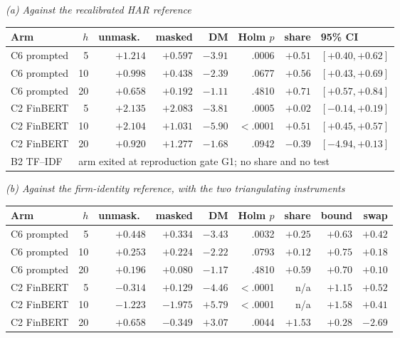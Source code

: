 \begin{table}[htbp]
\emph{(a) Against the recalibrated HAR reference}\\[0.4ex]
\begin{tabular}{@{}lrrrrrrl@{}}
\toprule
Arm & $h$ & unmask.\ & masked & DM & Holm $p$ & share & 95\% CI \\
\midrule
C6 prompted   &  5 & $+1.214$ & $+0.597$ & $-3.91$ & .0006 & $+0.51$ & $[+0.40, +0.62]$ \\
C6 prompted   & 10 & $+0.998$ & $+0.438$ & $-2.39$ & .0677 & $+0.56$ & $[+0.43, +0.69]$ \\
C6 prompted   & 20 & $+0.658$ & $+0.192$ & $-1.11$ & .4810 & $+0.71$ & $[+0.57, +0.84]$ \\
C2 FinBERT    &  5 & $+2.135$ & $+2.083$ & $-3.81$ & .0005 & $+0.02$ & $[-0.14, +0.19]$ \\
C2 FinBERT    & 10 & $+2.104$ & $+1.031$ & $-5.90$ & $<$.0001 & $+0.51$ & $[+0.45, +0.57]$ \\
C2 FinBERT    & 20 & $+0.920$ & $+1.277$ & $-1.68$ & .0942 & $-0.39$ & $[-4.94, +0.13]$ \\
B2 TF--IDF    & \multicolumn{7}{l}{arm exited at reproduction gate G1; no share and no test} \\
\bottomrule
\end{tabular}

\vspace{1.2ex}
\emph{(b) Against the firm-identity reference, with the two triangulating instruments}\\[0.4ex]
\begin{tabular}{@{}lrrrrrrrr@{}}
\toprule
Arm & $h$ & unmask.\ & masked & DM & Holm $p$ & share & bound & swap \\
\midrule
C6 prompted   &  5 & $+0.448$ & $+0.334$ & $-3.43$ & .0032 & $+0.25$ & $+0.63$ & $+0.42$ \\
C6 prompted   & 10 & $+0.253$ & $+0.224$ & $-2.22$ & .0793 & $+0.12$ & $+0.75$ & $+0.18$ \\
C6 prompted   & 20 & $+0.196$ & $+0.080$ & $-1.17$ & .4810 & $+0.59$ & $+0.70$ & $+0.10$ \\
C2 FinBERT    &  5 & $-0.314$ & $+0.129$ & $-4.46$ & $<$.0001 & n/a & $+1.15$ & $+0.52$ \\
C2 FinBERT    & 10 & $-1.223$ & $-1.975$ & $+5.79$ & $<$.0001 & n/a & $+1.58$ & $+0.41$ \\
C2 FinBERT    & 20 & $+0.658$ & $-0.349$ & $+3.07$ & .0044 & $+1.53$ & $+0.28$ & $-2.69$ \\
\bottomrule
\end{tabular}


\end{table}
